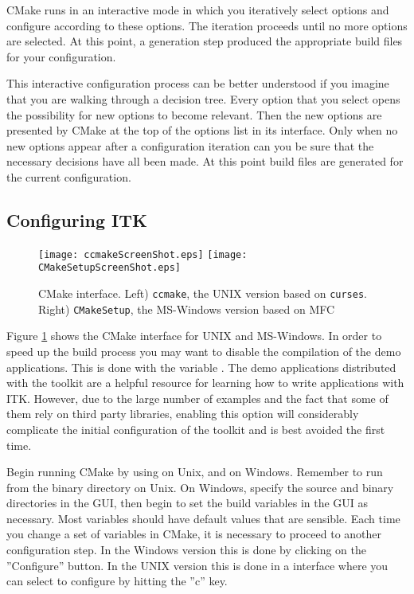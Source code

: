 CMake runs in an interactive mode in which you iteratively select options and
configure according to these options. The iteration proceeds until no more
options are selected. At this point, a generation step produced the appropriate
build files for your configuration.

This interactive configuration process can be better understood if you
imagine that you are walking through a decision tree.  Every option that you
select opens the possibility for new options to become relevant. Then the new
options are presented by CMake at the top of the options list in its
interface.  Only when no new options appear after a configuration iteration
can you be sure that the necessary decisions have all been made. At this point
build files are generated for the current configuration.

\subsection{Configuring ITK}
\label{sec:ConfiguringITKwithVTK}
  

\begin{figure}[ht]
\centering 
\texttt{[image: ccmakeScreenShot.eps]}
\texttt{[image: CMakeSetupScreenShot.eps]}
\caption[Cmake user interface]{CMake interface. Left) \texttt{ccmake}, the UNIX
version based on \texttt{curses}. Right) \texttt{CMakeSetup}, the MS-Windows
version based on MFC}
\label{fig:CMakeGUI}
\end{figure}

Figure \ref{fig:CMakeGUI} shows the CMake interface for UNIX and MS-Windows.
In order to speed up the build process you may want to disable the
compilation of the demo applications. This is done with the variable
. The demo applications  distributed with the
toolkit are a helpful resource for learning how to write applications with
ITK.  However, due to the large number of examples and the fact that some of
them rely on third party libraries, enabling this option will considerably
complicate the initial configuration of the toolkit and is best avoided the
first time.

Begin running CMake by using  on Unix, and  on
Windows. Remember to run  from the binary directory on Unix. On
Windows, specify the source and binary directories in the GUI, then begin to
set the build variables in the GUI as necessary.  Most variables should have
default values that are sensible. Each time you change a set of variables in
CMake, it is necessary to proceed to another configuration step. In the
Windows version this is done by clicking on the ''Configure'' button. In the
UNIX version this is done in a
 interface where you can select to configure by hitting the
''c'' key.

